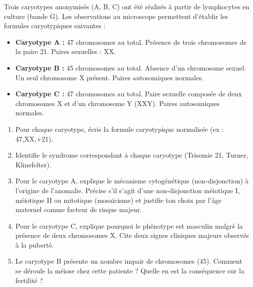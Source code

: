 \documentclass[11pt]{article}
\begin{document}
\begin{exercice}
Trois caryotypes anonymisés (A, B, C) ont été réalisés à partir de lymphocytes en culture (bande G). Les observations au microscope permettent d'établir les formules caryotypiques suivantes :
\begin{itemize}
    \item \textbf{Caryotype A :} 47 chromosomes au total. Présence de trois chromosomes de la paire 21. Paires sexuelles : XX.
    \item \textbf{Caryotype B :} 45 chromosomes au total. Absence d'un chromosome sexuel. Un seul chromosome X présent. Paires autosomiques normales.
    \item \textbf{Caryotype C :} 47 chromosomes au total. Paire sexuelle composée de deux chromosomes X et d'un chromosome Y (XXY). Paires autosomiques normales.
\end{itemize}

\begin{enumerate}
    \item Pour chaque caryotype, écris la formule caryotypique normalisée (ex : 47,XX,+21).
    \item Identifie le syndrome correspondant à chaque caryotype (Trisomie 21, Turner, Klinefelter).
    \item Pour le caryotype A, explique le mécanisme cytogénétique (non-disjonction) à l'origine de l'anomalie. Précise s'il s'agit d'une non-disjonction méiotique I, méiotique II ou mitotique (mosaïcisme) et justifie ton choix par l'âge maternel comme facteur de risque majeur.
    \item Pour le caryotype C, explique pourquoi le phénotype est masculin malgré la présence de deux chromosomes X. Cite deux signes cliniques majeurs observés à la puberté.
    \item Le caryotype B présente un nombre impair de chromosomes (45). Comment se déroule la méiose chez cette patiente ? Quelle en est la conséquence sur la fertilité ?
\end{enumerate}
\end{exercice}
\end{document}
